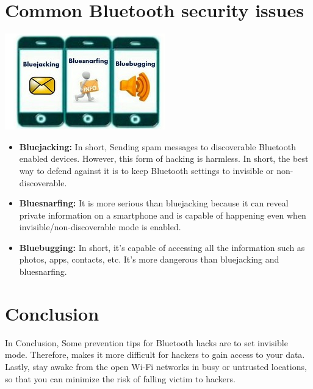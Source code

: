 \documentclass{report}
\begin{document}
\begin{multicols}{1}
     \section*{Common Bluetooth security issues}
     \includegraphics{issues}
    \begin{itemize}
        \item \textbf{Bluejacking:} In short, Sending spam messages to discoverable Bluetooth enabled devices. However, this form of hacking is harmless. In short, the best way to defend against it is to keep Bluetooth settings to invisible or non-discoverable.
        \item \textbf{Bluesnarfing:} It is more serious than bluejacking because it can reveal private information on a smartphone and is capable of happening even when invisible/non-discoverable mode is enabled.
        \item \textbf{Bluebugging:} In short, it’s capable of accessing all the information such as photos, apps, contacts, etc. It’s more dangerous than bluejacking and bluesnarfing.
    \end{itemize}
    
    \section*{Conclusion}

    In Conclusion, Some prevention tips for Bluetooth hacks are to set invisible mode. Therefore, makes it more difficult for hackers to gain access to your data. Lastly, stay awake from the open Wi-Fi networks in busy or untrusted locations, so that you can minimize the risk of falling victim to hackers.

  
    
\end{multicols}
\end{document}
